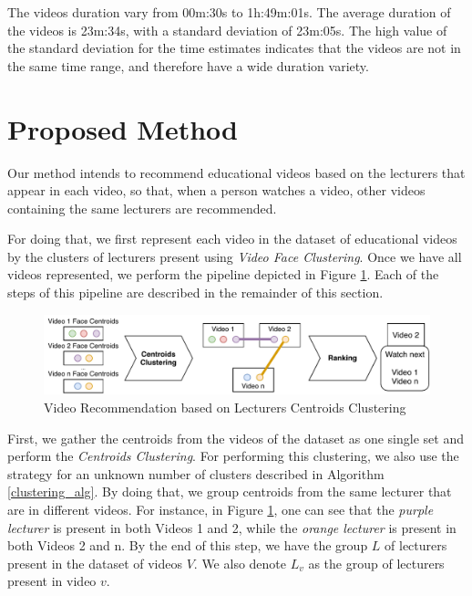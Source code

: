 The videos duration vary from 00m:30s to 1h:49m:01s. 
The average duration of the videos is 23m:34s, with a standard deviation of 23m:05s. 
The high value of the standard deviation for the time estimates indicates that the videos are not in the same time range, and therefore have a wide duration variety. 

\section{Proposed Method}
\label{sec:recommendation_method}

Our method intends to recommend educational videos based on the lecturers that appear in each video, so that, when a person watches a video, other videos containing the same lecturers are recommended.

For doing that, we first represent each video in the dataset of educational videos by the clusters of lecturers present using \emph{Video Face Clustering}. Once we have all videos represented, we perform the pipeline depicted in Figure \ref{fig:video_recommendation}. Each of the steps of this pipeline are described in the remainder of this section.

\begin{figure}[!ht]
  \centering
  \includegraphics[width=1\textwidth]{img/video_recommendation/video_recommendation.pdf}
  \caption{Video Recommendation based on Lecturers Centroids Clustering}
  \label{fig:video_recommendation}
\end{figure}

First, we gather the centroids from the videos of the dataset as one single set and perform the \textit{Centroids Clustering}.
For performing this clustering, we also use the strategy for an unknown number of clusters described in Algorithm \ref{clustering_alg}. 
By doing that, we group centroids from the same lecturer that are in different videos. For instance, in Figure \ref{fig:video_recommendation}, one can see that the \emph{purple lecturer} is present in both Videos 1 and 2, while the \emph{orange lecturer} is present in both Videos 2 and n. By the end of this step, we have the group $L$ of lecturers present in the dataset of videos $V$. We also denote $L_v$ as the group of lecturers present in video $v$.

